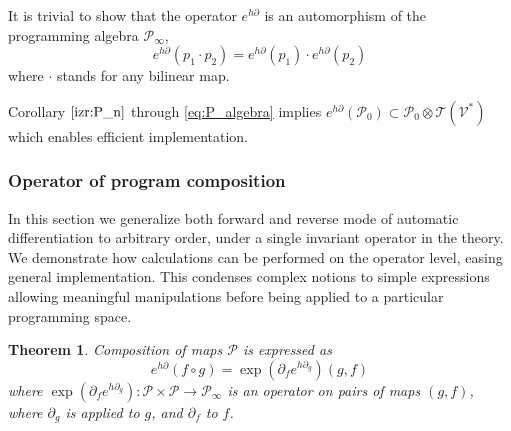 \documentclass[smallcondensed]{svjour3}
\newcommand{\T}{\mathcal{T}}
\newcommand{\VV}{\mathcal{V}}
\newcommand{\dP}{\mathcal{P}}
\newcommand{\D}{\partial}
\newtheorem{izrek}{Theorem}[section]
\begin{document}
 It is trivial to show that the operator $e^{h\D}$ is an automorphism of the programming algebra $\dP_\infty$,
\begin{equation}\label{eq:prod}
 	e^{h\D}(p_1\cdot p_2)=e^{h\D}(p_1)\cdot e^{h\D}(p_2)
 \end{equation}
 where $\cdot$ stands for any bilinear map.
 
 Corollary $\ref{izr:P_n}$ through \eqref{eq:P_algebra} implies
      	$e^{h\D}(\dP_0)\subset\dP_0\otimes \T(\VV^*)$      
 which enables efficient implementation. 
  
 \subsubsection{Operator of program composition}\label{sec:compsition}
 
 In this section we generalize both forward \cite{PcAD} and reverse \cite{ReverseAD} mode of automatic differentiation to arbitrary order, under a single invariant operator in the theory. We demonstrate how calculations can be performed on the operator level, easing general implementation. This condenses complex notions to simple expressions allowing meaningful manipulations before being applied to a particular programming space.
 
 \begin{izrek}\label{izr:kompo}
 Composition of maps $\dP$ is expressed as
 \begin{equation}\label{eq:kompo}
 e^{h\D}(f\circ g)=\exp(\D_fe^{h\D_g})(g,f)
 \end{equation}
 where $\exp(\D_fe^{h\D_g}):\dP\times\dP\to\dP_\infty$ is an operator on pairs of maps $(g,f)$, where $\D_g$ is applied to $g$, and $\D_f$ to $f$. 
 \end{izrek}
 
\end{document}
